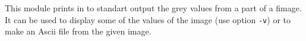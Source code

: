 This module prints in to standart output the grey values from a part of a fimage.
It can be used to display some of the values of the image (use option \verb+-v+) or to make an Ascii file from the given image.
